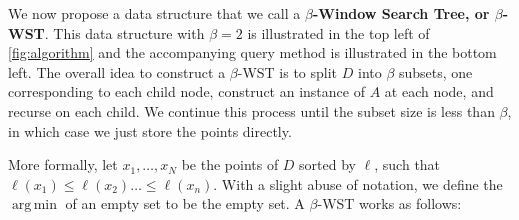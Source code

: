 \documentclass{article}
\theoremstyle{plain}
\theoremstyle{definition}
\theoremstyle{remark}
\DeclareMathOperator*{\argmin}{arg\,min}
\begin{document}
We now propose a data structure that we call a \textbf{$\beta$-Window Search Tree, or $\beta$-WST}. This data structure with $\beta = 2$ is illustrated in the top left of \cref{fig:algorithm} and the accompanying query method is illustrated in the bottom left. The overall idea to construct a $\beta$-WST is to split $D$ into $\beta$ subsets, one corresponding to each child node, construct an instance of $A$ at each node, and recurse on each child. We continue this process until the subset size is less than $\beta$, in which case we just store the points directly. 

More formally, let $x_1, \ldots, x_N$ be the points of $D$ sorted by $\ell$, such that $\ell(x_1) \le \ell(x_2) \ldots \le \ell(x_n)$. With a slight abuse of notation, we define the $\argmin$ of an empty set to be the empty set. A $\beta$-WST works as follows:
\end{document}
